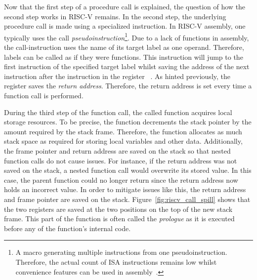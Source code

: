 Now that the first step of a procedure call is explained, the question of how the second step works in RISC-V remains.
In the second step, the underlying procedure call is made using a specialized instruction.
In RISC-V assembly, one typically uses the call \emph{pseudoinstruction}\footnote{A macro generating multiple instructions from one pseudoinstruction. Therefore, the actual count of ISA instructions remains low whilst convenience features can be used in assembly~\cite[p.~68]{Dandamudi2005}.}.
Due to a lack of functions in assembly, the call-instruction uses the name of its target label as one operand.
Therefore, labels can be called as if they were functions.
This instruction will jump to the first instruction of the specified target label whilst saving the address of the next instruction after the  instruction in the register ~\cite[p.~22]{Patterson2017}.
As hinted previously, the  register saves the \emph{return address}.
Therefore, the return address is set every time a function call is performed.

During the third step of the function call, the called function acquires local storage resources.
To be precise, the function decrements the stack pointer by the amount required by the stack frame.
Therefore, the function allocates as much stack space as required for storing local variables and other data.
Additionally, the frame pointer and return address are saved on the stack so that nested function calls do not cause issues.
For instance, if the return address was not saved on the stack, a nested function call would overwrite its stored value.
In this case, the parent function could no longer return since the return address now holds an incorrect value.
In order to mitigate issues like this, the return address and frame pointer are saved on the stack.
Figure~\ref{fig:riscv_call_spill} shows that the two registers are saved at the two positions on the top of the new stack frame.
This part of the function is often called the \emph{prologue} as it is executed before any of the function's internal code.

